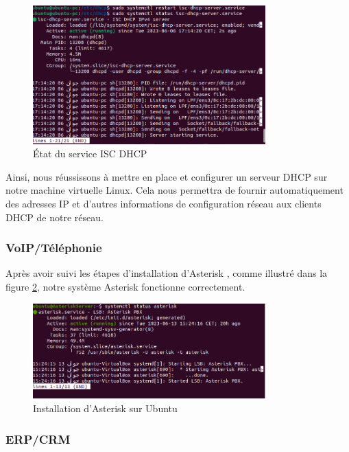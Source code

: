 \begin{figure}[H]
    \centering
    \includegraphics[width=0.8\textwidth]{Images/dhcp5.png}
    \caption{État du service ISC DHCP}
    \label{fig:isc-dhcp-service-status}
\end{figure}

Ainsi, nous réussissons  à mettre en place et configurer un serveur DHCP sur notre machine virtuelle Linux. Cela nous permettra de fournir automatiquement des adresses IP et d'autres informations de configuration réseau aux clients DHCP de notre réseau.

\subsubsection{VoIP/Téléphonie}

Après avoir suivi les étapes d'installation d'Asterisk \cite{asterisk-install-vegastack}, comme illustré dans la figure \ref{fig:asterisk-server1}, notre système Asterisk fonctionne correctement.

\begin{figure}[H]
    \centering
    \includegraphics[width=0.8\textwidth]{Images/AsteriskServer1.png}
    \caption{Installation d'Asterisk sur Ubuntu}
    \label{fig:asterisk-server1}
\end{figure}


\subsubsection{ERP/CRM}


